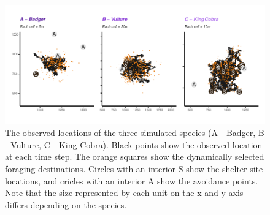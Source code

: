 \documentclass[10pt,a4paper]{article}
\begin{document}
\begin{figure}

{\centering \includegraphics{Agent-based_model_walkthrough_files/figure-latex/mapsFigure-1} 

}

\caption{The observed locations of the three simulated species (A - Badger, B - Vulture, C - King Cobra). Black points show the observed location at each time step. The orange squares show the dynamically selected foraging destinations. Circles with an interior S show the shelter site locations, and cricles with an interior A show the avoidance points. Note that the size represented by each unit on the x and y axis differs depending on the species.}\label{fig:mapsFigure}
\end{figure}
\end{document}
